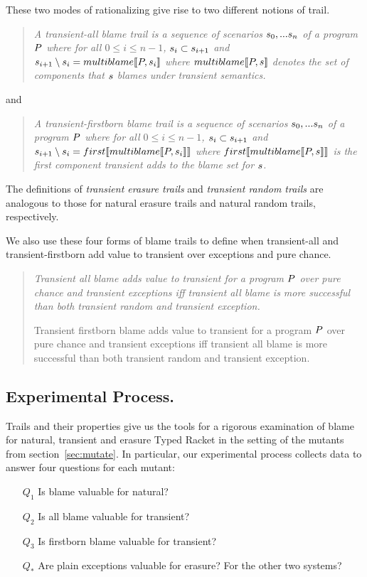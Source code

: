 These two modes of rationalizing give rise to two different notions of trail.
\begin{quote}
\it A \emph{ transient-all blame trail} is a sequence of scenarios
$s_0,...s_n$ of a program $P$ where for all $0 \leq i \leq n - 1$,
$s_i \subset s_{i+1}$ and ~$s_{i+1} \setminus s_i = multiblame\llbracket P,
s_i\rrbracket$ where $multiblame\llbracket P, s\rrbracket$ denotes the set of components that $s$
blames under transient semantics.
\end{quote}
\noindent
and
\begin{quote}
\it A \emph{transient-firstborn blame trail} is a sequence of scenarios
$s_0,...s_n$ of a program $P$ where for all $0 \leq i \leq n - 1$,
$s_i \subset s_{i+1}$ and $s_{i+1} \setminus s_i =
first\llbracket multiblame\llbracket P, s_i\rrbracket\rrbracket$ where $first\llbracket multiblame\llbracket P, s\rrbracket\rrbracket$ is the
first component transient adds to the blame set for $s$.
\end{quote}
The definitions of \emph{transient erasure trails} and \emph{transient random
trails} are analogous to those for natural erasure trails and natural random trails,
respectively. 

We also use these four forms of blame trails to define when transient-all and
transient-firstborn add value to transient over exceptions and pure chance.
\begin{quote}
\it 
Transient all blame adds value to transient for a program $P$ over
  pure chance and transient exceptions iff transient all blame 
  is more successful than both transient random and transient exception.

Transient firstborn blame adds value to transient for a program $P$ over
  pure chance and transient exceptions iff transient all blame 
  is more successful than both transient random and transient exception.

\end{quote}



\subsection{Experimental Process.}

Trails and their properties give us the tools for a rigorous examination
of blame for natural, transient and erasure Typed Racket in the setting of the 
mutants from section~\ref{sec:mutate}. In particular, our experimental
process collects data to answer four questions for each mutant:
\begin{itemize}
\item[$Q_1$] Is blame valuable for natural?

\item[$Q_2$] Is all blame valuable for transient?

\item[$Q_3$] Is firstborn blame valuable for transient?

\item[$Q_*$] Are plain exceptions valuable for
  erasure? For the other two systems? 
\end{itemize}

